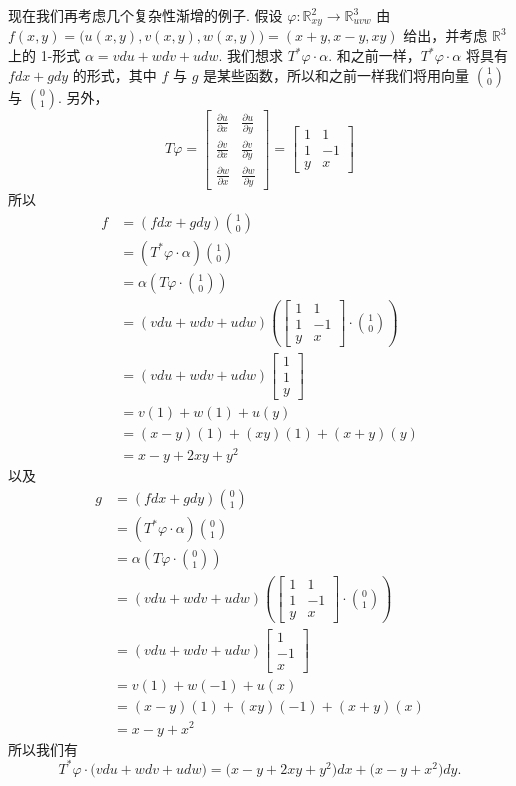 现在我们再考虑几个复杂性渐增的例子. 假设 $\varphi:\mathbb{R}^2_{xy}\to\mathbb{R}^3_{uvw}$ 由 $f(x,y)=\bigl(u(x,y),v(x,y),w(x,y)\bigr)=(x+y,x-y,xy)$ 给出，并考虑 $\mathbb{R}^3$ 上的 1-形式 $\alpha=vdu+wdv+udw$. 我们想求 $T^*\varphi\cdot\alpha$. 和之前一样，$T^*\varphi\cdot\alpha$ 将具有 $fdx+gdy$ 的形式，其中 $f$ 与 $g$ 是某些函数，所以和之前一样我们将用向量 $\binom{1}{0}$ 与 $\binom{0}{1}$. 另外，
\[
T\varphi=
\begin{bmatrix}
\frac{\partial u}{\partial x}&\frac{\partial u}{\partial y}\\
\frac{\partial v}{\partial x}&\frac{\partial v}{\partial y}\\
\frac{\partial w}{\partial x}&\frac{\partial w}{\partial y}
\end{bmatrix}
=
\begin{bmatrix}
1&1\\
1&-1\\
y&x
\end{bmatrix}
\]
所以
\begin{align*}
f&=(fdx+gdy)\binom{1}{0}\\
&=(T^*\varphi\cdot\alpha)\binom{1}{0}\\
&=\alpha\left(T\varphi\cdot\binom{1}{0}\right)\\
&=(vdu+wdv+udw)\left(\begin{bmatrix}1&1\\1&-1\\y&x\end{bmatrix}\cdot\binom{1}{0}\right)\\
&=(vdu+wdv+udw)\begin{bmatrix}1\\1\\y\end{bmatrix}\\
&=v(1)+w(1)+u(y)\\
&=(x-y)(1)+(xy)(1)+(x+y)(y)\\
&=x-y+2xy+y^2
\end{align*}
以及
\begin{align*}
g&=(fdx+gdy)\binom{0}{1}\\
&=(T^*\varphi\cdot\alpha)\binom{0}{1}\\
&=\alpha\left(T\varphi\cdot\binom{0}{1}\right)\\
&=(vdu+wdv+udw)\left(\begin{bmatrix}1&1\\1&-1\\y&x\end{bmatrix}\cdot\binom{0}{1}\right)\\
&=(vdu+wdv+udw)\begin{bmatrix}1\\-1\\x\end{bmatrix}\\
&=v(1)+w(-1)+u(x)\\
&=(x-y)(1)+(xy)(-1)+(x+y)(x)\\
&=x-y+x^2
\end{align*}
所以我们有
\[
T^*\varphi\cdot\bigl(vdu+wdv+udw\bigr)=\bigl(x-y+2xy+y^2\bigr)dx+\bigl(x-y+x^2\bigr)dy.
\]


